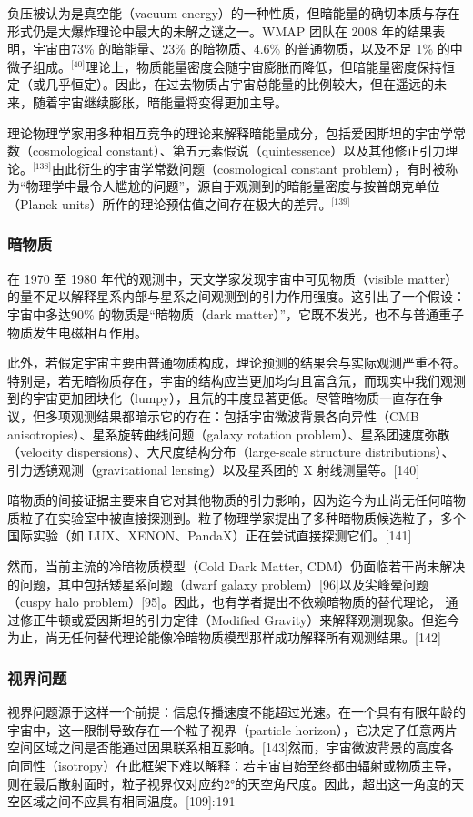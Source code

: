 负压被认为是真空能（vacuum energy）的一种性质，但暗能量的确切本质与存在形式仍是大爆炸理论中最大的未解之谜之一。WMAP 团队在 2008 年的结果表明，宇宙由73\% 的暗能量、23\% 的暗物质、4.6\% 的普通物质，以及不足 1\% 的中微子组成。\(^\text{[40]}\)理论上，物质能量密度会随宇宙膨胀而降低，但暗能量密度保持恒定（或几乎恒定）。因此，在过去物质占宇宙总能量的比例较大，但在遥远的未来，随着宇宙继续膨胀，暗能量将变得更加主导。

理论物理学家用多种相互竞争的理论来解释暗能量成分，包括爱因斯坦的宇宙学常数（cosmological constant）、第五元素假说（quintessence）以及其他修正引力理论。\(^\text{[138]}\)由此衍生的宇宙学常数问题（cosmological constant problem），有时被称为“物理学中最令人尴尬的问题”，源自于观测到的暗能量密度与按普朗克单位（Planck units）所作的理论预估值之间存在极大的差异。\(^\text{[139]}\)
\subsubsection{暗物质}
在 1970 至 1980 年代的观测中，天文学家发现宇宙中可见物质（visible matter）的量不足以解释星系内部与星系之间观测到的引力作用强度。这引出了一个假设：宇宙中多达90\% 的物质是“暗物质（dark matter）”，它既不发光，也不与普通重子物质发生电磁相互作用。  

此外，若假定宇宙主要由普通物质构成，理论预测的结果会与实际观测严重不符。  
特别是，若无暗物质存在，宇宙的结构应当更加均匀且富含氘，而现实中我们观测到的宇宙更加团块化（lumpy），且氘的丰度显著更低。尽管暗物质一直存在争议，但多项观测结果都暗示它的存在：包括宇宙微波背景各向异性（CMB anisotropies）、星系旋转曲线问题（galaxy rotation problem）、星系团速度弥散（velocity dispersions）、大尺度结构分布（large-scale structure distributions）、 引力透镜观测（gravitational lensing）以及星系团的 X 射线测量等。[140]

暗物质的间接证据主要来自它对其他物质的引力影响，因为迄今为止尚无任何暗物质粒子在实验室中被直接探测到。粒子物理学家提出了多种暗物质候选粒子，多个国际实验（如 LUX、XENON、PandaX）正在尝试直接探测它们。[141]

然而，当前主流的冷暗物质模型（Cold Dark Matter, CDM）仍面临若干尚未解决的问题，其中包括矮星系问题（dwarf galaxy problem）[96]以及尖峰晕问题（cuspy halo problem）[95]。因此，也有学者提出不依赖暗物质的替代理论，  
通过修正牛顿或爱因斯坦的引力定律（Modified Gravity）来解释观测现象。但迄今为止，尚无任何替代理论能像冷暗物质模型那样成功解释所有观测结果。[142]
\subsubsection{视界问题}
视界问题源于这样一个前提：信息传播速度不能超过光速。在一个具有有限年龄的宇宙中，这一限制导致存在一个粒子视界（particle horizon），它决定了任意两片空间区域之间是否能通过因果联系相互影响。[143]然而，宇宙微波背景的高度各向同性（isotropy）在此框架下难以解释：若宇宙自始至终都由辐射或物质主导，则在最后散射面时，粒子视界仅对应约2°的天空角尺度。因此，超出这一角度的天空区域之间不应具有相同温度。[109]: 191 

